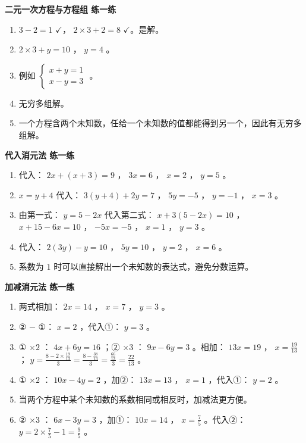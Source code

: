 \begin{answer}


\textbf{二元一次方程与方程组 练一练}

\begin{enumerate}
  \item $3 - 2 = 1$ $\checkmark$， $2 \times 3 + 2 = 8$ $\checkmark$。是解。
  \item $2 \times 3 + y = 10$ ， $y = 4$ 。
  \item 例如 $\begin{cases} x + y = 1 \\ x - y = 3 \end{cases}$ 。
  \item 无穷多组解。
  \item 一个方程含两个未知数，任给一个未知数的值都能得到另一个，因此有无穷多组解。
\end{enumerate}


\textbf{代入消元法 练一练}

\begin{enumerate}
  \item 代入： $2x + (x + 3) = 9$ ， $3x = 6$ ， $x = 2$ ， $y = 5$ 。
  \item $x = y + 4$ 代入： $3(y + 4) + 2y = 7$ ， $5y = -5$ ， $y = -1$ ， $x = 3$ 。
  \item 由第一式： $y = 5 - 2x$ 代入第二式： $x + 3(5 - 2x) = 10$ ， $x + 15 - 6x = 10$ ， $-5x = -5$ ， $x = 1$ ， $y = 3$ 。
  \item 代入： $2(3y) - y = 10$ ， $5y = 10$ ， $y = 2$ ， $x = 6$ 。
  \item 系数为 $1$ 时可以直接解出一个未知数的表达式，避免分数运算。
\end{enumerate}


\textbf{加减消元法 练一练}

\begin{enumerate}
  \item 两式相加： $2x = 14$ ， $x = 7$ ， $y = 3$ 。
  \item ② $-$ ①： $x = 2$ ，代入①： $y = 3$ 。
  \item ① $\times 2$ ： $4x + 6y = 16$ ；② $\times 3$ ： $9x - 6y = 3$ 。相加： $13x = 19$ ， $x = \frac{19}{13}$ ； $y = \frac{8 - 2 \times \frac{19}{13}}{3} = \frac{8 - \frac{38}{13}}{3} = \frac{\frac{66}{13}}{3} = \frac{22}{13}$ 。
  \item ① $\times 2$ ： $10x - 4y = 2$ ，加②： $13x = 13$ ， $x = 1$ ，代入①： $y = 2$ 。
  \item 当两个方程中某个未知数的系数相同或相反时，加减法更方便。
  \item ② $\times 3$ ： $6x - 3y = 3$ ，加①： $10x = 14$ ， $x = \frac{7}{5}$ 。代入②： $y = 2 \times \frac{7}{5} - 1 = \frac{9}{5}$ 。
\end{enumerate}



\end{answer}
